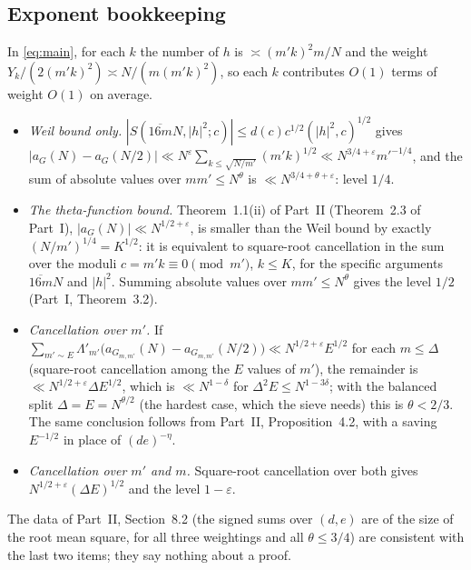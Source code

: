 \documentclass[11pt]{amsart}
\theoremstyle{remark}
\newcommand{\e}{\varepsilon}
\begin{document}
\subsection{Exponent bookkeeping}\label{subsec:book}
In \eqref{eq:main}, for each $k$ the number of $h$ is $\asymp(m'k)^2m/N$ and the weight $Y_k/(2(m'k)^2)\asymp N/(m(m'k)^2)$, so each $k$ contributes $O(1)$ terms of weight $O(1)$ on average.
\begin{itemize}[leftmargin=1.6em]
\item \emph{Weil bound only.} $|S(\overline{16m}N,|h|^2;c)|\le d(c)c^{1/2}(|h|^2,c)^{1/2}$ gives $|a_G(N)-a_G(N/2)|\ll N^\e\sum_{k\le\sqrt{N/m'}}(m'k)^{1/2}\ll N^{3/4+\e}m'^{-1/4}$, and the sum of absolute values over $mm'\le N^\theta$ is $\ll N^{3/4+\theta+\e}$: level $1/4$.
\item \emph{The theta-function bound.} Theorem~1.1(ii) of Part~II (Theorem~2.3 of Part~I), $|a_G(N)|\ll N^{1/2+\e}$, is smaller than the Weil bound by exactly $(N/m')^{1/4}=K^{1/2}$: it is equivalent to square-root cancellation in the sum over the moduli $c=m'k\equiv0\pmod{m'}$, $k\le K$, for the specific arguments $\overline{16m}N$ and $|h|^2$. Summing absolute values over $mm'\le N^\theta$ gives the level $1/2$ (Part~I, Theorem~3.2).
\item \emph{Cancellation over $m'$.} If $\sum_{m'\sim E}\Lambda'_{m'}\bigl(a_{G_{m,m'}}(N)-a_{G_{m,m'}}(N/2)\bigr)\ll N^{1/2+\e}E^{1/2}$ for each $m\le\Delta$ (square-root cancellation among the $E$ values of $m'$), the remainder is $\ll N^{1/2+\e}\Delta E^{1/2}$, which is $\ll N^{1-\delta}$ for $\Delta^2E\le N^{1-3\delta}$; with the balanced split $\Delta=E=N^{\theta/2}$ (the hardest case, which the sieve needs) this is $\theta<2/3$. The same conclusion follows from Part~II, Proposition~4.2, with a saving $E^{-1/2}$ in place of $(de)^{-\eta}$.
\item \emph{Cancellation over $m'$ and $m$.} Square-root cancellation over both gives $N^{1/2+\e}(\Delta E)^{1/2}$ and the level $1-\e$.
\end{itemize}
The data of Part~II, Section~8.2 (the signed sums over $(d,e)$ are of the size of the root mean square, for all three weightings and all $\theta\le3/4$) are consistent with the last two items; they say nothing about a proof.
\end{document}
